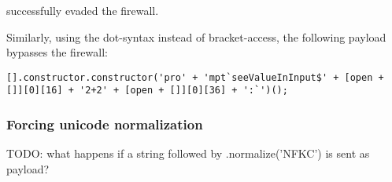 successfully evaded the firewall.

Similarly, using the dot-syntax instead of bracket-access, the following payload bypasses the firewall:

\begin{lstlisting}[style=basicStyle, caption=avoiding {} bypass payload using dot notation, label={lst:stringreplacepass}]
[].constructor.constructor('pro' + 'mpt`seeValueInInput$' + [open + []][0][16] + '2+2' + [open + []][0][36] + ':`')();
\end{lstlisting}




\subsubsection{Forcing unicode normalization}
{\color{red} TODO: what happens if a string followed by .normalize('NFKC') is sent as payload?}
